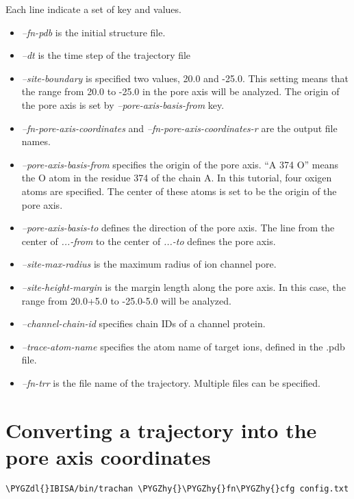 \documentclass[letterpaper,10pt,english]{sphinxmanual}
\def\PYGZdl{\char`\$}
\def\PYGZhy{\char`\-}
\begin{document}
Each line indicate a set of key and values.
\begin{itemize}
\item {} 
\emph{--fn-pdb} is the initial structure file.

\item {} 
\emph{--dt} is the time step of the trajectory file

\item {} 
\emph{--site-boundary} is specified two values, 20.0 and -25.0. This setting means that the range from 20.0 to -25.0 in the pore axis will be analyzed. The origin of the pore axis is set by \emph{--pore-axis-basis-from} key.

\item {} 
\emph{--fn-pore-axis-coordinates} and \emph{--fn-pore-axis-coordinates-r} are the output file names.

\item {} 
\emph{--pore-axis-basis-from} specifies the origin of the pore axis. ``A 374 O'' means the O atom in the residue 374 of the chain A. In this tutorial, four oxigen atoms are specified. The center of these atoms is set to be the origin of the pore axis.

\item {} 
\emph{--pore-axis-basis-to} defines the direction of the pore axis. The line from the center of \emph{...-from} to the center of \emph{...-to} defines the pore axis.

\item {} 
\emph{--site-max-radius} is the maximum radius of ion channel pore.

\item {} 
\emph{--site-height-margin} is the margin length along the pore axis. In this case, the range from 20.0+5.0 to -25.0-5.0 will be analyzed.

\item {} 
\emph{--channel-chain-id} specifies chain IDs of a channel protein.

\item {} 
\emph{--trace-atom-name} specifies the atom name of target ions, defined in the .pdb file.

\item {} 
\emph{--fn-trr} is the file name of the trajectory. Multiple files can be specified.

\end{itemize}


\section{Converting a trajectory into the pore axis coordinates}
\label{tutorial:converting-a-trajectory-into-the-pore-axis-coordinates}
\begin{Verbatim}[commandchars=\\\{\}]
\PYGZdl{}IBISA/bin/trachan \PYGZhy{}\PYGZhy{}fn\PYGZhy{}cfg config.txt
\end{Verbatim}
\end{document}
